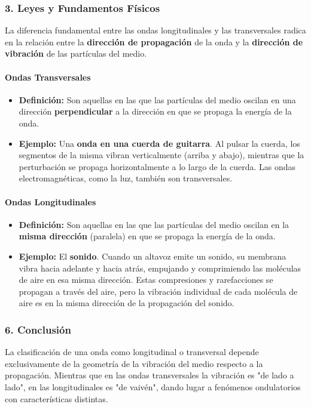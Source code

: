 \subsubsection*{3. Leyes y Fundamentos Físicos}
La diferencia fundamental entre las ondas longitudinales y las transversales radica en la relación entre la \textbf{dirección de propagación} de la onda y la \textbf{dirección de vibración} de las partículas del medio.

\paragraph*{Ondas Transversales}
\begin{itemize}
    \item \textbf{Definición:} Son aquellas en las que las partículas del medio oscilan en una dirección \textbf{perpendicular} a la dirección en que se propaga la energía de la onda.
    \item \textbf{Ejemplo:} Una \textbf{onda en una cuerda de guitarra}. Al pulsar la cuerda, los segmentos de la misma vibran verticalmente (arriba y abajo), mientras que la perturbación se propaga horizontalmente a lo largo de la cuerda. Las ondas electromagnéticas, como la luz, también son transversales.
\end{itemize}

\paragraph*{Ondas Longitudinales}
\begin{itemize}
    \item \textbf{Definición:} Son aquellas en las que las partículas del medio oscilan en la \textbf{misma dirección} (paralela) en que se propaga la energía de la onda.
    \item \textbf{Ejemplo:} El \textbf{sonido}. Cuando un altavoz emite un sonido, su membrana vibra hacia adelante y hacia atrás, empujando y comprimiendo las moléculas de aire en esa misma dirección. Estas compresiones y rarefacciones se propagan a través del aire, pero la vibración individual de cada molécula de aire es en la misma dirección de la propagación del sonido.
\end{itemize}

\subsubsection*{6. Conclusión}
\begin{cajaconclusion}
La clasificación de una onda como longitudinal o transversal depende exclusivamente de la geometría de la vibración del medio respecto a la propagación. Mientras que en las ondas transversales la vibración es "de lado a lado", en las longitudinales es "de vaivén", dando lugar a fenómenos ondulatorios con características distintas.
\end{cajaconclusion}

